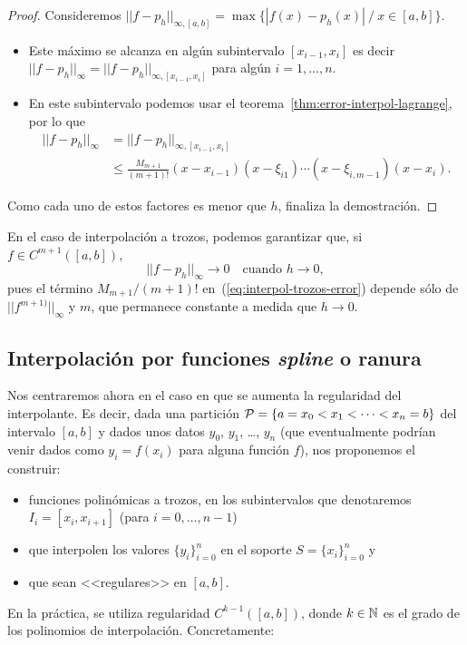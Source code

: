 \begin{proof}
  Consideremos $||f-p_h||_{\infty, [a,b]}=\max\{ |f(x)-p_h(x)|\ /\
  x\in[a,b]\}$.
  \begin{itemize}
  \item Este máximo se alcanza en algún subintervalo $[x_{i-1},x_{i}]$
    es decir $||f-p_h||_{\infty}=||f-p_h||_{\infty, [x_{i-1},x_i]}$
    para algún $i=1,\dots,n$.
  \item En este subintervalo podemos usar el
    teorema~\ref{thm:error-interpol-lagrange}, por lo que
    \begin{align*}
      ||f-p_h||_\infty &= ||f-p_h||_{\infty, [x_{i-1},x_i]}  \\
      &\le\frac{M_{m+1}}{(m+1)!}
      (x-x_{i-1})(x-\xi_{i1})\cdots(x-\xi_{i,m-1})(x-x_i).
    \end{align*}
  \end{itemize}
  Como cada uno de estos factores es menor que $h$, finaliza la
  demostración.
\end{proof}

\begin{remark}
  \label{rk:3}
  En el caso de interpolación a trozos, podemos garantizar que, si
  $f\in C^{m+1}([a,b])$,
  \begin{equation*}
    ||f-p_h||_\infty \to 0 \quad \text{cuando } h \to 0,
  \end{equation*}
  pues el término $M_{m+1}/(m+1)!$ en~(\ref{eq:interpol-trozos-error})
  depende sólo de $||f^{m+1)}||_\infty$ y $m$, que permanece constante
    a medida que $h\to 0$.
\end{remark}

\subsection{Interpolación por funciones \textit{spline} o ranura}
\label{sec:splines}

Nos centraremos ahora en
el caso en que se aumenta la regularidad del interpolante.
Es decir, dada una partición 
${\cal P}= \{a = x_0 <x_1 < \cdots <x_n=b\}$
del intervalo $[a,b]$ y dados unos datos $y_0$, $y_1$, \dots, $y_n$
(que eventualmente podrían venir dados como $y_i=f(x_i)$ para alguna
función $f$), nos proponemos el construir:
\begin{itemize}
\item  funciones polinómicas a trozos, en los subintervalos que
  denotaremos $I_i=[x_{i},x_{i+1}]$ (para $ i=0,\dots,n-1$)
\item que interpolen los valores $\{y_i\}_{i=0}^n$ en el soporte
  $S=\{x_i\}_{i=0}^n$ y
\item que sean <<regulares>> en $[a,b]$.
\end{itemize}
En la práctica, se utiliza regularidad $C^{k-1}([a,b])$, donde
$k\in\operatorname{{\mathbb N}}$ es el grado de los polinomios de
interpolación. Concretamente:%

